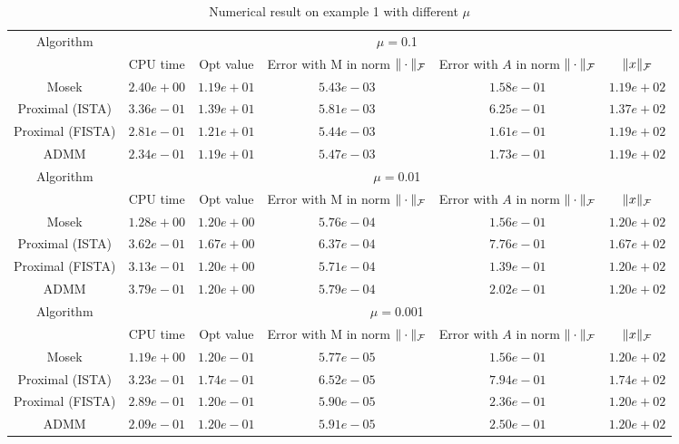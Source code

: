 \documentclass{article}
\begin{document}
\begin{table}[H]
	\centering
	\begin{tabular}{|c|c|c|c|c|c|}
	
	\hline
	\multirow{2}{*}{ Algorithm} &\multicolumn{5}{c|}{$\mu=$0.1}\\\cline{2-6}
	 &CPU time &Opt value &Error with M in norm $\|\cdot\|_\mathcal F$ &Error with $A$ in norm $\|\cdot\|_\mathcal F$ &$\|x\|_\mathcal F$\\\hline
	Mosek & $2.40e+00$ & $1.19e+01$ & $5.43e-03$ & $1.58e-01$ & $1.19e+02$\\\hline
	Proximal (ISTA) & $3.36e-01$ & $1.39e+01$ & $5.81e-03$ & $6.25e-01$ & $1.37e+02$\\\hline
	Proximal (FISTA) & $2.81e-01$ & $1.21e+01$ & $5.44e-03$ & $1.61e-01$ & $1.19e+02$\\\hline
	ADMM & $2.34e-01$ & $1.19e+01$ & $5.47e-03$ & $1.73e-01$ & $1.19e+02$\\\hline
	\multirow{2}{*}{ Algorithm} &\multicolumn{5}{c|}{$\mu=$0.01}\\\cline{2-6}
 &CPU time &Opt value &Error with M in norm $\|\cdot\|_\mathcal F$ &Error with $A$ in norm $\|\cdot\|_\mathcal F$ &$\|x\|_\mathcal F$\\\hline
	Mosek & $1.28e+00$ & $1.20e+00$ & $5.76e-04$ & $1.56e-01$ & $1.20e+02$\\\hline
	Proximal (ISTA) & $3.62e-01$ & $1.67e+00$ & $6.37e-04$ & $7.76e-01$ & $1.67e+02$\\\hline
	Proximal (FISTA) & $3.13e-01$ & $1.20e+00$ & $5.71e-04$ & $1.39e-01$ & $1.20e+02$\\\hline
	ADMM & $3.79e-01$ & $1.20e+00$ & $5.79e-04$ & $2.02e-01$ & $1.20e+02$\\\hline
	\multirow{2}{*}{ Algorithm} &\multicolumn{5}{c|}{$\mu=$0.001}\\\cline{2-6}
 &CPU time &Opt value &Error with M in norm $\|\cdot\|_\mathcal F$ &Error with $A$ in norm $\|\cdot\|_\mathcal F$ &$\|x\|_\mathcal F$\\\hline
Mosek & $1.19e+00$ & $1.20e-01$ & $5.77e-05$ & $1.56e-01$ & $1.20e+02$\\\hline
Proximal (ISTA) & $3.23e-01$ & $1.74e-01$ & $6.52e-05$ & $7.94e-01$ & $1.74e+02$\\\hline
Proximal (FISTA) & $2.89e-01$ & $1.20e-01$ & $5.90e-05$ & $2.36e-01$ & $1.20e+02$\\\hline
ADMM & $2.09e-01$ & $1.20e-01$ & $5.91e-05$ & $2.50e-01$ & $1.20e+02$\\\hline
   \end{tabular}
   \caption{Numerical result on example 1 with different $\mu$\label{example1}}
   \end{table}
   	
\end{document}
